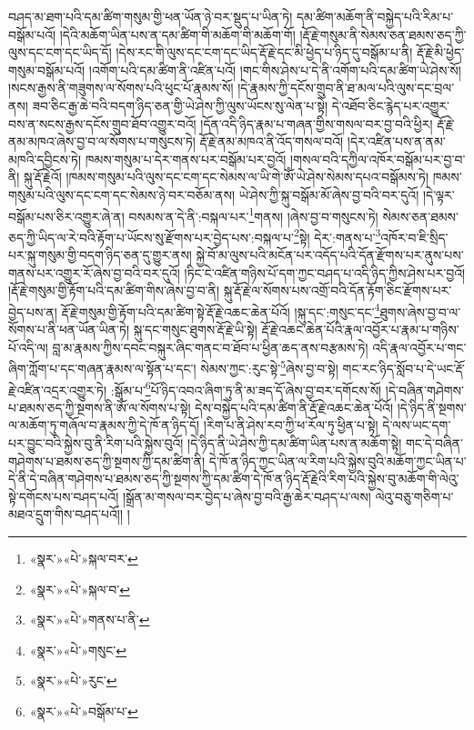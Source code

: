 བཤད་མ་ཐག་པའི་དམ་ཚིག་གསུམ་གྱི་ཕན་ཡོན་ཉེ་བར་སྡུད་པ་ཡིན་ཏེ། དམ་ཚིག་མཆོག་ནི་བསྐྱེད་པའི་རིམ་པ་བསྒོམ་པའོ། །དེའི་མཆོག་ཡིན་པས་ན་དམ་ཚིག་གི་མཆོག་གི་མཆོག་གོ། །རྡོ་རྗེ་གསུམ་ནི་སེམས་ཅན་ཐམས་ཅད་ཀྱི་ལུས་དང་ངག་དང་ཡིད་དོ། །དེས་རང་གི་ལུས་དང་ངག་དང་ཡིད་རྡོ་རྗེ་དང་མི་ཕྱེད་པ་ཉིད་དུ་བསྒོམ་པ་ནི། རྡོ་རྗེ་མི་ཕྱེད་གསུམ་བསྒོམ་པའོ། །འགོག་པའི་དམ་ཚིག་ནི་འཛིན་པའོ། །གང་གིས་ཤེས་པ་དེ་ནི་འགོག་པའི་དམ་ཚིག་ཡེ་ཤེས་སོ། །སངས་རྒྱས་ནི་གཟུགས་ལ་སོགས་པའི་ཕུང་པོ་རྣམས་སོ། །དེ་རྣམས་ཀྱི་དངོས་གྲུབ་ནི་ཐ་མལ་པའི་ལུས་དང་བྲལ་ནས། ཟབ་ཅིང་རྒྱ་ཆེ་བའི་བདག་ཉིད་ཅན་གྱི་ཡེ་ཤེས་ཀྱི་ལུས་ཡོངས་སུ་ལེན་པ་སྟེ། དེ་འཐོབ་ཅིང་རྙེད་པར་འགྱུར་བས་ན་སངས་རྒྱས་དངོས་གྲུབ་ཐོབ་འགྱུར་བའོ། །དོན་འདི་ཉིད་རྣམ་པ་གཞན་གྱིས་གསལ་བར་བྱ་བའི་ཕྱིར། རྡོ་རྗེ་ནམ་མཁའ་ཞེས་བྱ་བ་ལ་སོགས་པ་གསུངས་ཏེ། རྡོ་རྗེ་ནམ་མཁའ་ནི་འོད་གསལ་བའོ། །དེར་འཛིན་པས་ན་ནམ་མཁའི་དབྱིངས་ཏེ། ཁམས་གསུམ་པ་དེར་གནས་པར་བསྒོམ་པར་བྱའོ། །གསལ་བའི་དཀྱིལ་འཁོར་བསྒོམ་པར་བྱ་བ་ནི། སྐུ་རྡོ་རྗེའོ། །ཁམས་གསུམ་པའི་ལུས་དང་ངག་དང་སེམས་ལ་ཡི་གེ་ཨོཾ་ཡེ་ཤེས་སེམས་དཔའ་བསྒོམས་ཏེ། ཁམས་གསུམ་པའི་ལུས་དང་ངག་དང་སེམས་ཉེ་བར་བཅོམ་ནས། ཡེ་ཤེས་ཀྱི་སྐུ་བསྒོམ་མོ་ཞེས་བྱ་བའི་བར་དུའོ། །དེ་ལྟར་བསྒོམ་པས་ཅིར་འགྱུར་ཞེ་ན། བསམས་ན་དེ་ནི་:བསྐལ་པར་\footnote{«སྣར་»«པེ་»སྐལ་བར་}གནས། །ཞེས་བྱ་བ་གསུངས་ཏེ། སེམས་ཅན་ཐམས་ཅད་ཀྱི་ཡིད་ལ་རེ་བའི་རྟོག་པ་ཡོངས་སུ་རྫོགས་པར་བྱེད་པས་:བསྐལ་པ་\footnote{«སྣར་»«པེ་»སྐལ་བ་}སྟེ། དེར་:གནས་པ་\footnote{«སྣར་»«པེ་»གནས་པ་ནི་}འཁོར་བ་ཇི་སྲིད་པར་སྐུ་གསུམ་གྱི་བདག་ཉིད་ཅན་དུ་གྱུར་ནས། སྐྱེ་བོ་མ་ལུས་པའི་མངོན་པར་འདོད་པའི་དོན་རྫོགས་པར་ནུས་པས་གནས་པར་འགྱུར་རོ་ཞེས་བྱ་བའི་བར་དུའོ། །ཏིང་ངེ་འཛིན་གཉིས་པོ་དག་ཀྱང་བཤད་པ་འདི་ཉིད་ཀྱིས་ཤེས་པར་བྱའོ། །རྡོ་རྗེ་གསུམ་གྱི་རྟོག་པའི་དམ་ཚིག་གིས་ཞེས་བྱ་བ་ནི། སྐུ་རྡོ་རྗེ་ལ་སོགས་པས་འགྲོ་བའི་དོན་རྟོག་ཅིང་རྫོགས་པར་བྱེད་པས་ན། རྡོ་རྗེ་གསུམ་གྱི་རྟོག་པའི་དམ་ཚིག་སྟེ་རྡོ་རྗེ་འཆང་ཆེན་པོའོ། །སྐུ་དང་:གསུང་དང་\footnote{«སྣར་»«པེ་»གསུང་}ཐུགས་ཞེས་བྱ་བ་ལ་སོགས་པ་ནི་ཕན་ཡོན་ཡིན་ཏེ། སྐུ་དང་གསུང་ཐུགས་རྡོ་རྗེ་ཡི་སྟེ། རྡོ་རྗེ་འཆང་ཆེན་པོའི་རྣལ་འབྱོར་པ་རྣམ་པ་གཉིས་པོ་འདི་ལ། བླ་མ་རྣམས་ཀྱིས་དབང་བསྐུར་ཞིང་གནང་བ་ཐོབ་པ་ཕྱིན་ཆད་ནས་བརྩམས་ཏེ། འདི་རྣལ་འབྱོར་པ་གང་ཞིག་ཀློག་པ་དང་གཞན་རྣམས་ལ་སྟོན་པ་དང་། སེམས་ཀྱང་:རུང་སྟེ་\footnote{«སྣར་»«པེ་»རུང་}ཞེས་བྱ་བ་སྟེ། གང་རང་ཉིད་སློབ་པ་དེ་ཡང་རྡོ་རྗེ་འཛིན་འདྲར་འགྱུར་ཏེ། :སྒོམ་པ་\footnote{«སྣར་»«པེ་»བསྒོམ་པ་}པོ་ཉིད་འབའ་ཞིག་ཏུ་ནི་མ་ཟད་དོ་ཞེས་བྱ་བར་དགོངས་སོ། །དེ་བཞིན་གཤེགས་པ་ཐམས་ཅད་ཀྱི་སྔགས་ནི་ཨོཾ་ལ་སོགས་པ་སྟེ། དེས་བསྐྱེད་པའི་དམ་ཚིག་ནི་རྡོ་རྗེ་འཆང་ཆེན་པོའོ། །དེ་ཉིད་ནི་སྔགས་ལ་མཆོག་ཏུ་གཞོལ་བ་རྣམས་ཀྱི་དེ་ཁོ་ན་ཉིད་དོ། །རིག་པ་ནི་ཤེས་རབ་ཀྱི་ཕ་རོལ་ཏུ་ཕྱིན་པ་སྟེ། དེ་ལས་ཡང་དག་པར་བྱུང་བའི་སྐྱེས་བུ་ནི་རིག་པའི་སྐྱེས་བུའོ། །དེ་ཉིད་ནི་ཡེ་ཤེས་ཀྱི་དམ་ཚིག་ཡིན་པས་ན་མཆོག་སྟེ། གང་དེ་བཞིན་གཤེགས་པ་ཐམས་ཅད་ཀྱི་སྔགས་ཀྱི་དམ་ཚིག་ནི། དེ་ཁོ་ན་ཉིད་ཀྱང་ཡིན་ལ་རིག་པའི་སྐྱེས་བུའི་མཆོག་ཀྱང་ཡིན་པ་དེ་ནི་དེ་བཞིན་གཤེགས་པ་ཐམས་ཅད་ཀྱི་སྔགས་ཀྱི་དམ་ཚིག་དེ་ཁོ་ན་ཉིད་རྡོ་རྗེའི་རིག་པའི་སྐྱེས་བུ་མཆོག་གི་ལེའུ་སྟེ་དགོངས་པས་བཤད་པའོ། །སྒྲོན་མ་གསལ་བར་བྱེད་པ་ཞེས་བྱ་བའི་རྒྱ་ཆེར་བཤད་པ་ལས། ལེའུ་བཅུ་གཅིག་པ་མཐའ་དྲུག་གིས་བཤད་པའོ།། །
